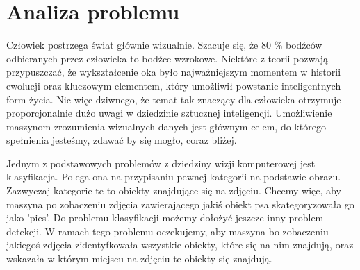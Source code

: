 \documentclass[a4paper,twoside,12pt]{book}
\begin{document}
\section{Analiza problemu}
{Człowiek postrzega świat głównie wizualnie. Szacuje się, że 80 \% bodźców odbieranych przez człowieka to bodźce wzrokowe. Niektóre z teorii \cite{nilsson2013eye} pozwają przypuszczać, że wykształcenie oka było najważniejszym momentem w historii ewolucji oraz kluczowym elementem, który umożliwił powstanie inteligentnych form życia. Nic więc dziwnego, że temat tak znaczący dla człowieka otrzymuje proporcjonalnie dużo uwagi w dziedzinie sztucznej inteligencji. Umożliwienie maszynom zrozumienia wizualnych danych jest głównym celem, do którego spełnienia jesteśmy, zdawać by się mogło, coraz bliżej.}

{Jednym z podstawowych problemów z dziedziny wizji komputerowej jest klasyfikacja. Polega ona na przypisaniu pewnej kategorii na podstawie obrazu. Zazwyczaj kategorie te to obiekty znajdujące się na zdjęciu. Chcemy więc, aby maszyna po zobaczeniu zdjęcia zawierającego jakiś obiekt  psa skategoryzowała go jako 'pies'. Do problemu klasyfikacji możemy dołożyć jeszcze inny problem – detekcji. W ramach tego problemu oczekujemy, aby maszyna bo zobaczeniu jakiegoś zdjęcia zidentyfkowała wszystkie obiekty, które się na nim znajdują, oraz wskazała w którym miejscu na zdjęciu te obiekty się znajdują.}
\end{document}
